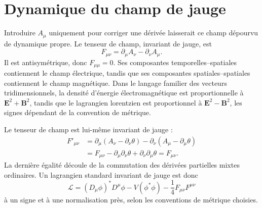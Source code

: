 \section{Dynamique du champ de jauge}

Introduire \(A_\mu\) uniquement pour corriger une dérivée laisserait ce champ dépourvu de dynamique propre. Le tenseur de champ, invariant de jauge, est
\begin{equation}
  F_{\mu\nu}
  =\partial_\mu A_\nu-\partial_\nu A_\mu.
  \label{eq:l07-field-strength}
\end{equation}
Il est antisymétrique, donc \(F_{\mu\mu}=0\). Ses composantes temporelles--spatiales contiennent le champ électrique, tandis que ses composantes spatiales--spatiales contiennent le champ magnétique. Dans le langage familier des vecteurs tridimensionnels, la densité d’énergie électromagnétique est proportionnelle à \(\bm E^2+\bm B^2\), tandis que le lagrangien lorentzien est proportionnel à \(\bm E^2-\bm B^2\), les signes dépendant de la convention de métrique.

\begin{classroomqa}
\end{classroomqa}

Le tenseur de champ est lui-même invariant de jauge :
\begin{align}
  F'_{\mu\nu}
  &=
  \partial_\mu(A_\nu-\partial_\nu\theta)
  -\partial_\nu(A_\mu-\partial_\mu\theta)
  \nonumber\\
  &=
  F_{\mu\nu}
  -\partial_\mu\partial_\nu\theta
  +\partial_\nu\partial_\mu\theta
  =F_{\mu\nu}.
  \label{eq:l07-field-strength-invariant}
\end{align}
La dernière égalité découle de la commutation des dérivées partielles mixtes ordinaires. Un lagrangien standard invariant de jauge est donc
\begin{equation}
  \boxed{
  \mathcal L
  =(D_\mu\phi)^*D^\mu\phi
  -V(\phi^*\phi)
  -\frac14F_{\mu\nu}F^{\mu\nu}}
  \label{eq:l07-scalar-qed}
\end{equation}
à un signe et à une normalisation près, selon les conventions de métrique choisies.

